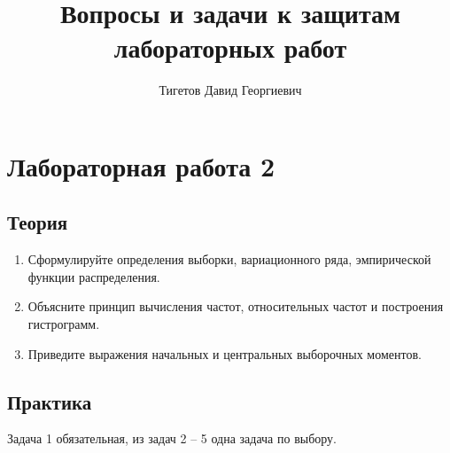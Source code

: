 \documentclass[a4paper,12pt]{article}
\begin{document}
\title{Вопросы и задачи к защитам лабораторных работ}
\author{Тигетов Давид Георгиевич}
\maketitle

\section*{Лабораторная работа 2}

\subsection*{Теория}

\begin{enumerate}
    \item Сформулируйте определения выборки, вариационного ряда, эмпирической функции распределения.
    \item Объясните принцип вычисления частот, относительных частот и построения гистрограмм.
    \item Приведите выражения начальных и центральных выборочных моментов.
\end{enumerate}

\subsection*{Практика}

Задача 1 обязательная, из задач 2 -- 5 одна задача по выбору.
\end{document}
